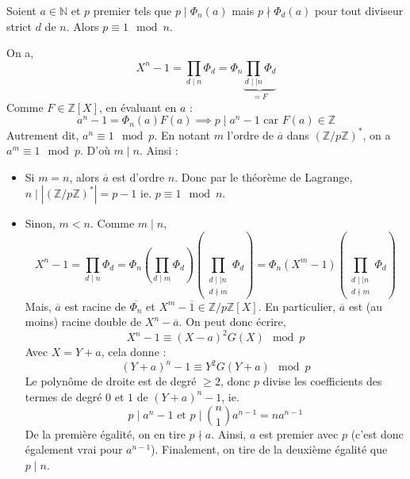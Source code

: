 


	
	
	
	\begin{lemma}
		\label{theoreme-dirichlet-faible-1}
		Soient $a \in \mathbb{N}$ et $p$ premier tels que $p \mid \Phi_n(a)$ mais $p \nmid \Phi_d(a)$ pour tout diviseur strict $d$ de $n$. Alors $p \equiv 1 \mod n$.
	\end{lemma}
	
	\begin{demonstration}
		On a,
		\[ X^n - 1 = \prod_{d \mid n} \Phi_d = \Phi_n \underbrace{\prod_{d \mid \mid n} \Phi_d}_{= F} \]
		Comme $F \in \mathbb{Z}[X]$, en évaluant en $a$ :
		\[ a^n - 1 = \Phi_n(a) F(a) \implies p \mid a^n - 1 \text{ car } F(a) \in \mathbb{Z} \]
		Autrement dit, $a^n \equiv 1 \mod p$. En notant $m$ l'ordre de $\overline{a}$ dans $(\mathbb{Z}/p\mathbb{Z})^*$, on a $a^m \equiv 1 \mod p$. D'où $m \mid n$. Ainsi :
		\begin{itemize}
			\item Si $m = n$, alors $\overline{a}$ est d'ordre $n$. Donc par le théorème de Lagrange, $n \mid |(\mathbb{Z}/p\mathbb{Z})^*| = p-1$ ie. $p \equiv 1 \mod n$.
			\item Sinon, $m < n$. Comme $m \mid n$,
			\[ X^n-1 = \prod_{d \mid n} \Phi_d = \Phi_n \left ( \prod_{d \mid m} \Phi_d \right ) \left ( \prod_{\substack{d \mid \mid n \\ d \nmid m}} \Phi_d \right ) = \Phi_n (X^m - 1) \left ( \prod_{\substack{d \mid \mid n \\ d \nmid m}} \Phi_d \right ) \]
			Mais, $\overline{a}$ est racine de $\overline{\Phi_n}$ et $X^m - \overline{1} \in \mathbb{Z}/p\mathbb{Z}[X]$. En particulier, $\overline{a}$ est (au moins) racine double de $X^n - \overline{a}$. On peut donc écrire,
			\[ X^n - 1 \equiv (X-a)^2 G(X) \mod p \]
			Avec $X = Y+a$, cela donne :
			\[ (Y+a)^n - 1 \equiv Y^2 G(Y+a) \mod p \]
			Le polynôme de droite est de degré $\geq 2$, donc $p$ divise les coefficients des termes de degré $0$ et $1$ de $(Y+a)^n-1$, ie.
			\[ p \mid a^n - 1 \text{ et } p \mid \binom{n}{1} a^{n-1} = n a^{n-1} \]
			De la première égalité, on en tire $p \nmid a$. Ainsi, $a$ est premier avec $p$ (c'est donc également vrai pour $a^{n-1}$). Finalement, on tire de la deuxième égalité que $p \mid n$.
		\end{itemize}
	\end{demonstration}
	
